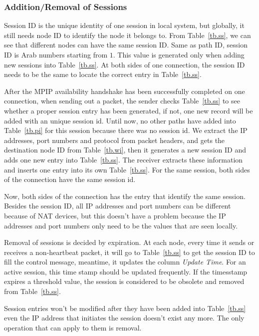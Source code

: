 \subsubsection{Addition/Removal of Sessions}

Session ID is the unique identity of one session in local system, but globally, it still needs node ID to identify the node it belongs to. From Table~\ref{tb.ss}, we can see that different nodes can have the same session ID. Same as path ID, session ID is Arab numbers starting from $1$. This value is generated only when adding new sessions into Table~\ref{tb.ss}. At both sides of one connection, the session ID needs to be the same to locate the correct entry in Table~\ref{tb.ss}.

After the MPIP availability handshake has been successfully completed on one connection, when sending out a packet, the sender checks Table~\ref{tb.ss} to see whether a proper session entry has been generated, if not, one new record will be added with an unique session id. Until now, no other paths have added into Table~\ref{tb.pi} for this session because there was no session id. We extract the IP addresses, port numbers and protocol from packet headers, and gets the destination node ID from Table~\ref{tb.wi}, then it generates a new session ID and adds one new entry into Table~\ref{tb.ss}. The receiver extracts these information and inserts one entry into its own Table~\ref{tb.ss}. For the same session, both sides of the connection have the same session id.

Now, both sides of the connection has the entry that identify the same session. Besides the session ID, all IP addresses and port numbers can be different because of NAT devices, but this doesn\textquoteright t have a problem because the IP addresses and port numbers only need to be the values that are seen locally.

Removal of sessions is decided by expiration. At each node, every time it sends or receives a non-heartbeat packet, it will go to Table~\ref{tb.ss} to get the session ID to fill the control message, meantime, it updates the column \emph{Update Time}. For an active session, this time stamp should be updated frequently. If the timesstamp expires a threshold value, the session is considered to be obsolete and removed from Table~\ref{tb.ss}.

Session entries won\textquoteright t be modified after they have been added into Table~\ref{tb.ss} even the IP address that initiates the session doesn\textquoteright t exist any more. The only operation that can apply to them is removal. 

